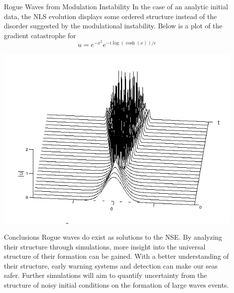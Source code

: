 \documentclass[final]{beamer}
\begin{document}
\begin{frame}{}
\begin{columns}[t]
\begin{column}{.35\linewidth}
\begin{block}{Rogue Waves from Modulation Instability}
	\vspace{5mm}
In the case of an analytic initial data, the NLS evolution displays some ordered structure instead of the disorder suggested by the modulational instability. Below is a plot of the gradient catastrophe for \[ u=e^{-x^2}e^{-i\log (\cosh (x)) /\epsilon } \]
		
		\vspace{-.25cm}
				\centering
\includegraphics[width=670px]{t1_65536pts_512plotted.png}


			\end{block}
		\hspace{0.25cm}
			\begin{block}{Conclusions}
	Rogue waves do exist as solutions to the NSE. By analyzing their structure through simulations, more insight into the universal structure of their formation can be gained. With a better understanding of their structure, early warning systems and detection can make our seas safer. Further simulations will aim to quantify uncertainty from the structure of noisy initial conditions on the formation of large waves events.\\[1ex]
		\end{block}
		
		
\end{column}  


\begin{column}{.005\linewidth}
\end{column}  
	\begin{column}{.255\linewidth}
   

\end{column}
\end{columns}
\end{frame}
\end{document}
